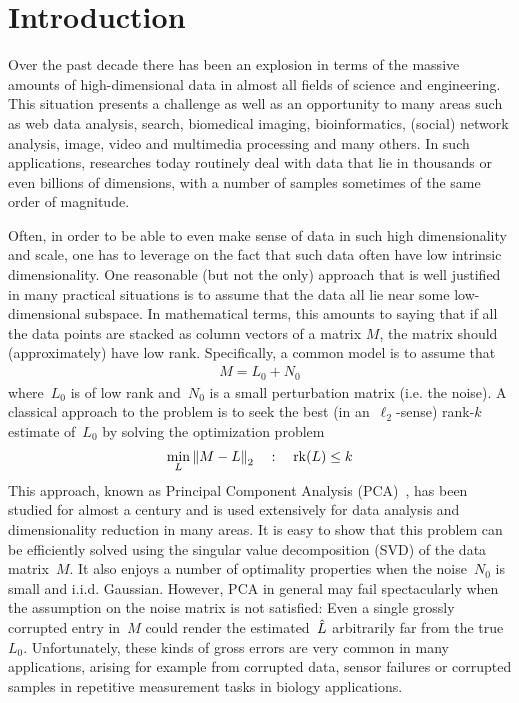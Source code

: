 \section*{Introduction}

Over the past decade there has been an explosion in terms of the massive amounts of high-dimensional data in almost all fields of science and engineering. This situation presents a challenge as well as an opportunity to many areas such as web data analysis, search, biomedical imaging, bioinformatics, (social) network analysis, image, video and multimedia processing and many others. In such applications, researches today routinely deal with data that lie in thousands or even billions of dimensions, with a number of samples sometimes of the same order of magnitude.

Often, in order to be able to even make sense of data in such high dimensionality and scale, one has to leverage on the fact that such data often have low intrinsic dimensionality. One reasonable (but not the only) approach that is well justified in many practical situations is to assume that the data all lie near some low-dimensional subspace. In mathematical terms, this amounts to saying that if all the data points are stacked as column vectors of a matrix $M$, the matrix should (approximately) have low rank. Specifically, a common model is to assume that 
%
\begin{align}
M=L_0+N_0
\label{IntroMot:lowrankness}
\end{align}
%
where~$L_0$ is of low rank and~$N_0$ is a small perturbation matrix (i.e. the noise). A classical approach to the problem is to seek the best (in an~$\ell_2$-sense) rank-$k$ estimate of~$L_0$ by solving the optimization problem
%
\begin{align}
\min_L {\left\|M-L\right\|}_{2}^{} \quad:\quad \operatorname{rk}(L)\leq k
\label{IntroMot:ClassicPCA}
\end{align}
%
This approach, known as Principal Component Analysis (PCA)~\cite{Eckart:1936uq,Hotelling:1933fk}, has been studied for almost a century and is used extensively for data analysis and dimensionality reduction in many areas. It is easy to show that this problem can be efficiently solved using the singular value decomposition (SVD) of the data matrix~$M$. It also enjoys a number of optimality properties when the noise~$N_0$ is small and i.i.d. Gaussian. However, PCA in general may fail spectacularly when the assumption on the noise matrix is not satisfied: Even a single grossly corrupted entry in~$M$ could render the estimated~${\hat{L}}$ arbitrarily far from the true~$L_0$. Unfortunately, these kinds of gross errors are very common in many applications, arising for example from corrupted data, sensor failures or corrupted samples in repetitive measurement tasks in biology applications. 

